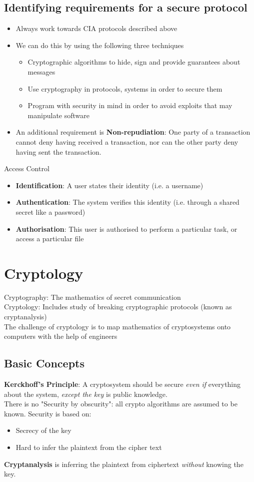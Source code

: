 \documentclass{article}
\begin{document}
    \subsection{Identifying requirements for a secure protocol}
    \begin{itemize}
        \item Always work towards CIA protocols described above
        \item We can do this by using the following three techniques
        \begin{itemize}
            \item Cryptographic algorithms to hide, sign and provide guarantees about messages
            \item Use cryptography in protocols, systems in order to secure them
            \item Program with security in mind in order to avoid exploits that may manipulate software
        \end{itemize}
        \item An additional requirement is \textbf{Non-repudiation}: One party of a transaction cannot deny having received a transaction, nor can the other party deny having sent the transaction.
    \end{itemize}
    Access Control
    \begin{itemize}
        \item \textbf{Identification}: A user states their identity (i.e. a username)
        \item \textbf{Authentication}: The system verifies this identity (i.e. through a shared secret like a password)
        \item \textbf{Authorisation}: This user is authorised to perform a particular task, or access a particular file
        \end{itemize}
\section{Cryptology}
Cryptography: The mathematics of secret communication
\\Cryptology: Includes study of breaking cryptographic protocols (known as cryptanalysis)
\\The challenge of cryptology is to map mathematics of cryptosystems onto computers with the help of engineers
\subsection{Basic Concepts}
\textbf{Kerckhoff's Principle}: A cryptosystem should be secure \textit{even if} everything about the system, \textit{except the key} is public knowledge.
\\There is no "Security by obscurity": all crypto algorithms are assumed to be known. Security is based on:
\begin{itemize}
    \item Secrecy of the key
    \item Hard to infer the plaintext from the cipher text
\end{itemize}
\textbf{Cryptanalysis} is inferring the plaintext from ciphertext \textit{without} knowing the key.
\end{document}
